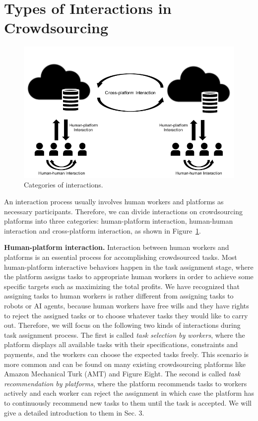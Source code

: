 \documentclass[11pt]{article}
\newcommand\figref[1]{Figure~\ref{#1}}
\newcommand{\fakeparagraph}[1]{\vspace{1mm}\noindent\textbf{#1.}}
\begin{document}
\section{Types of Interactions in Crowdsourcing}

\begin{figure}
\centering
\includegraphics[scale=0.9]{submissions/yongxin/figs/category.pdf}

\caption{Categories of interactions.}
\label{fig:category}
\end{figure}

An interaction process usually involves human workers and platforms as necessary participants. 
Therefore, we can divide interactions on crowdsourcing platforms into three categories: human-platform interaction, human-human interaction and cross-platform interaction, as shown in \figref{fig:category}.

\fakeparagraph{Human-platform interaction}
Interaction between human workers and platforms is an essential process for accomplishing crowdsourced tasks. 
Most human-platform interactive behaviors happen in the task assignment stage, where the platform assigns tasks to appropriate human workers in order to achieve some specific targets such as maximizing the total profits. 
We have recognized that assigning tasks to human workers is rather different from assigning tasks to robots or AI agents, because human workers have free wills and they have rights to reject the assigned tasks or to choose whatever tasks they would like to carry out. 
Therefore, we will focus on the following two kinds of interactions during task assignment process. 
The first is called \textit{task selection by workers}, where the platform displays all available tasks with their specifications, constraints and payments, and the workers can choose the expected tasks freely. This scenario is more common and can be found on many existing crowdsourcing platforms like Amazon Mechanical Turk (AMT) and Figure Eight. 
The second is called \textit{task recommendation by platforms}, where the platform recommends tasks to workers actively and each worker can reject the assignment in which case the platform has to continuously recommend new tasks to them until the task is accepted. 
We will give a detailed introduction to them in Sec. 3.
\end{document}

